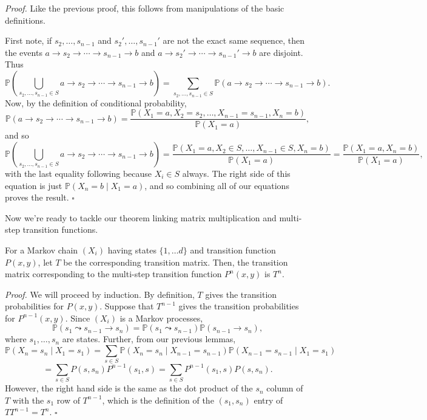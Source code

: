 \documentclass{problemset}
\newcommand{\1}{\mathbf{1}}
\renewcommand{\P}{\mathbb{P}}
\newenvironment{proof}{\emph{Proof.}}{\hfill$\square$}
\begin{document}
	\begin{proof}
		Like the previous proof, this follows from manipulations of the basic definitions.

		First note, if $s_2,\ldots, s_{n-1}$ and $s_2',\ldots, s_{n-1}'$ are not the exact
		same sequence, then the events $a\to s_2\to \cdots \to s_{n-1}\to b$ and
		$a\to s_2'\to \cdots \to s_{n-1}'\to b$ are disjoint.  Thus
		\[
			\P\left(\bigcup_{s_2,\ldots,s_{n-1}\in S} a\to s_2\to \cdots \to s_{n-1}\to b\right) = 
			\sum_{s_2,\ldots,s_{n-1}\in S} \P(a\to s_2\to \cdots \to s_{n-1}\to b).
		\]
		Now, by the definition of conditional probability,
		\[
			\P(a\to s_2\to \cdots \to s_{n-1}\to b) = \frac{\P(X_1=a, X_2=s_2,\ldots, X_{n-1}=s_{n-1},X_n=b)}{\P(X_1=a)},
		\]
		and so
		\[
			\P\left(\bigcup_{s_2,\ldots,s_{n-1}\in S} a\to s_2\to \cdots \to s_{n-1}\to b\right)
			=\frac{\P(X_1=a, X_2\in S,\ldots, X_{n-1}\in S,X_n=b)}{\P(X_1=a)} = \frac{\P(X_1=a, X_n=b)}{\P(X_1=a)},
		\]
		with the last equality following because  $X_i\in S$ always.  The right side of this equation
		is just $\P(X_n=b\mid X_1=a)$, and so combining all of our equations proves the result.
	\end{proof}


	Now we're ready to tackle our theorem linking matrix multiplication and multi-step transition
	functions.
	
	\begin{theorem}
		For a Markov chain $(X_i)$ having states $\{1,\ldots d\}$ and transition function $P(x,y)$,
		let $T$ be the corresponding transition matrix.  Then, the transition matrix corresponding 
		to the multi-step transition function $P^n(x,y)$ is $T^n$.
	\end{theorem}

	\begin{proof}
		We will proceed by induction.  
		By definition, $T$ gives the transition probabilities for $P(x,y)$.
		Suppose that $T^{n-1}$ gives the transition probabilities for $P^{n-1}(x,y)$.  Since
		$(X_i)$ is a Markov processes, 
		\[
			\P(s_1\leadsto s_{n-1}\to s_n) = \P(s_1\leadsto s_{n-1})\P(s_{n-1}\to s_n),
		\]
		where $s_1,\ldots, s_n$ are states.  Further, from our previous lemmas,
		\[
			\P(X_n=s_n\mid X_1=s_1) = \sum_{s\in S} \P(X_n=s_n\mid X_{n-1}=s_{n-1})\P(X_{n-1}=s_{n-1}\mid 
			X_1=s_1) 
		\]\[
			= \sum_{s\in S} P(s,s_n)P^{n-1}(s_1,s)
			= \sum_{s\in S} P^{n-1}(s_1,s)P(s,s_n).
		\]
		However, the right hand side is the same as the dot product of the $s_n$ column of $T$ with the
		$s_1$ row of $T^{n-1}$, which is the definition of the $(s_1,s_n)$ entry of $TT^{n-1}=T^n$.
	\end{proof}
\end{document}
